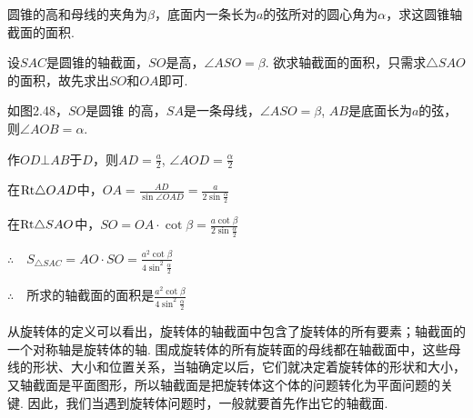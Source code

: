 \begin{example}
    圆锥的高和母线的夹角为$\beta$，底面内一条长为$a$的弦所对的圆心角为$\alpha$，求这圆锥轴截面的面积.
\end{example}

\begin{analyze}
   设$SAC$是圆锥的轴截面，$SO$是高，$\angle ASO=\beta$. 欲求轴截面的面积，只需求$\triangle SAO$的面积，故先求出$SO$和$OA$即可.
\end{analyze}

\begin{solution}
如图2.48，$SO$是圆锥
    的高，$SA$是一条母线，$\angle ASO=\beta$, $AB$是底面长为$a$的弦，则$\angle AOB=\alpha$.

\noindent
\begin{minipage}{.65\textwidth}\CTEXindent
作$OD\bot AB$于$D$，则$AD=\frac{a}{2}$, $\angle AOD=\frac{\alpha}{2}$

在${\rm Rt}\triangle OAD$中，$OA=\frac{AD}{\sin\angle OAD}=\frac{a}{2\sin\frac{\alpha}{2}}$

在${\rm Rt}\triangle SAO$中，$SO=OA\cdot \cot\beta=\frac{a\cot\beta}{2\sin\frac{\alpha}{2}}$

$\therefore\quad S_{\triangle SAC}=AO\cdot SO=\frac{a^2\cot\beta}{4\sin^2\frac{\alpha}{2}}$

$\therefore\quad$所求的轴截面的面积是$\frac{a^2\cot\beta}{4\sin^2\frac{\alpha}{2}}$
\end{minipage}
\hfill
\begin{minipage}{.32\textwidth}
\centering
{}
\end{minipage}
\end{solution}

\begin{remark}
从旋转体的定义可以看出，旋转体的轴截面中包含了旋转体的所有要素；轴截面的一个对称轴是旋转体的轴. 围成旋转体的所有旋转面的母线都在轴截面中，这些母线的形状、大小和位置关系，当轴确定以后，它们就决定着旋转体的形状和大小，又轴截面是平面图形，所以轴截面是把旋转体这个体的问题转化为平面问题的关键. 因此，我们当遇到旋转体问题时，一般就要首先作出它的轴截面.
\end{remark}
    
